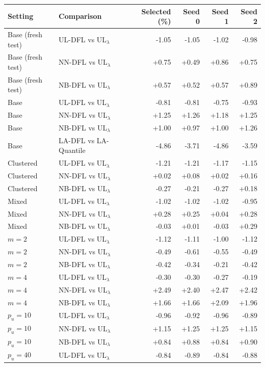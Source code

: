 \begin{tabular}{llrrrr}
\toprule
Setting & Comparison & Selected (\%) & Seed 0 & Seed 1 & Seed 2 \\
\midrule
Base (fresh test) & UL-DFL vs UL$_\lambda$ & -1.05 & -1.05 & -1.02 & -0.98 \\
Base (fresh test) & NN-DFL vs UL$_\lambda$ & +0.75 & +0.49 & +0.86 & +0.75 \\
Base (fresh test) & NB-DFL vs UL$_\lambda$ & +0.57 & +0.52 & +0.57 & +0.89 \\
Base & UL-DFL vs UL$_\lambda$ & -0.81 & -0.81 & -0.75 & -0.93 \\
Base & NN-DFL vs UL$_\lambda$ & +1.25 & +1.26 & +1.18 & +1.25 \\
Base & NB-DFL vs UL$_\lambda$ & +1.00 & +0.97 & +1.00 & +1.26 \\
Base & LA-DFL vs LA-Quantile & -4.86 & -3.71 & -4.86 & -3.59 \\
Clustered & UL-DFL vs UL$_\lambda$ & -1.21 & -1.21 & -1.17 & -1.15 \\
Clustered & NN-DFL vs UL$_\lambda$ & +0.02 & +0.08 & +0.02 & +0.16 \\
Clustered & NB-DFL vs UL$_\lambda$ & -0.27 & -0.21 & -0.27 & +0.18 \\
Mixed & UL-DFL vs UL$_\lambda$ & -1.02 & -1.02 & -1.02 & -0.95 \\
Mixed & NN-DFL vs UL$_\lambda$ & +0.28 & +0.25 & +0.04 & +0.28 \\
Mixed & NB-DFL vs UL$_\lambda$ & -0.03 & +0.01 & -0.03 & +0.29 \\
$m=2$ & UL-DFL vs UL$_\lambda$ & -1.12 & -1.11 & -1.00 & -1.12 \\
$m=2$ & NN-DFL vs UL$_\lambda$ & -0.49 & -0.61 & -0.55 & -0.49 \\
$m=2$ & NB-DFL vs UL$_\lambda$ & -0.42 & -0.34 & -0.21 & -0.42 \\
$m=4$ & UL-DFL vs UL$_\lambda$ & -0.30 & -0.30 & -0.27 & -0.19 \\
$m=4$ & NN-DFL vs UL$_\lambda$ & +2.49 & +2.40 & +2.47 & +2.42 \\
$m=4$ & NB-DFL vs UL$_\lambda$ & +1.66 & +1.66 & +2.09 & +1.96 \\
$p_u=10$ & UL-DFL vs UL$_\lambda$ & -0.96 & -0.92 & -0.96 & -0.89 \\
$p_u=10$ & NN-DFL vs UL$_\lambda$ & +1.15 & +1.25 & +1.25 & +1.15 \\
$p_u=10$ & NB-DFL vs UL$_\lambda$ & +0.84 & +0.88 & +0.84 & +0.90 \\
$p_u=40$ & UL-DFL vs UL$_\lambda$ & -0.84 & -0.89 & -0.84 & -0.88 \\

\end{tabular}
